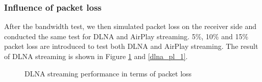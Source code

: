 \subsubsection{Influence of packet loss}
After the bandwidth test, we then simulated packet loss on the receiver side and
conducted the same test for DLNA and AirPlay streaming. 5\%, 10\% and 15\%
packet loss are introduced to test both DLNA and AirPlay streaming. The result
of DLNA streaming is shown in Figure \ref{dlna_pl} and \ref{dlna_pl_1}.
\begin{figure}[hb]
\caption{DLNA streaming performance in terms of packet loss \label{dlna_pl}}
\end{figure}

